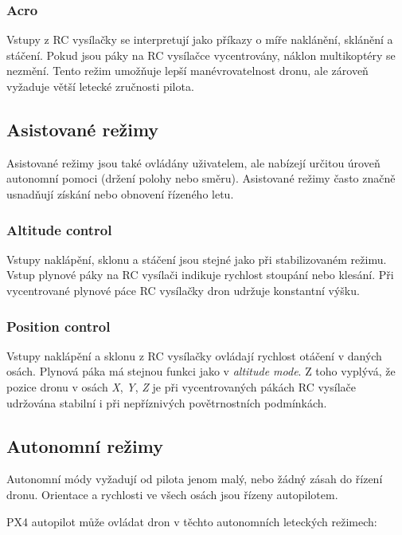 \subsubsection{Acro}

Vstupy z RC vysílačky se interpretují jako příkazy o míře naklánění, sklánění a stáčení. Pokud jsou páky na RC vysílačce vycentrovány, náklon multikoptéry se nezmění. Tento režim umožňuje lepší manévrovatelnost dronu, ale zároveň vyžaduje větší letecké zručnosti pilota.

\subsection{Asistované režimy}

Asistované režimy jsou také ovládány uživatelem, ale nabízejí určitou úroveň autonomní pomoci (držení polohy nebo směru). Asistované režimy často značně usnadňují získání nebo obnovení řízeného letu.

\subsubsection{Altitude control}

Vstupy naklápění, sklonu a stáčení jsou stejné jako při stabilizovaném režimu. Vstup plynové páky na RC vysílači indikuje rychlost stoupání nebo klesání. Při vycentrované plynové páce RC vysílačky dron udržuje konstantní výšku.
        
\subsubsection{Position control}

Vstupy naklápění a sklonu z RC vysílačky ovládají rychlost  otáčení v daných osách. Plynová páka má stejnou funkci jako v \textit{altitude mode}. Z toho vyplývá, že pozice dronu v osách \textit{X}, \textit{Y}, \textit{Z} je při vycentrovaných pákách RC vysílače udržována stabilní i při nepříznivých povětrnostních podmínkách.

\subsection{Autonomní režimy}

Autonomní módy vyžadují od pilota jenom malý, nebo žádný zásah do řízení dronu. Orientace a rychlosti ve všech osách jsou řízeny autopilotem.

PX4 autopilot může ovládat dron v těchto autonomních leteckých režimech: \cite{PX4docs}

